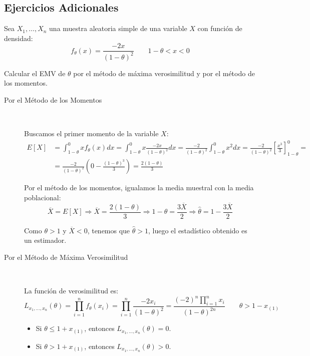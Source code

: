 \subsection*{Ejercicios Adicionales}
\begin{ejercicio}[Reto]
    Sea $X_1, \ldots, X_n$ una muestra aleatoria simple de una variable $X$ con función de densidad:
    \begin{equation*}
        f_\theta(x) = \dfrac{-2x}{(1-\theta)^2}\qquad 1-\theta < x < 0
    \end{equation*}

    Calcular el EMV de $\theta$ por el método de máxima verosimilitud y por el método de los momentos.
    \begin{description}
        \item[Por el Método de los Momentos]~
        
        Buscamos el primer momento de la variable $X$:
        \begin{align*}
            E[X] &= \int_{1-\theta}^{0} x f_\theta(x) dx = \int_{1-\theta}^{0} x \frac{-2x}{(1-\theta)^2} dx = \frac{-2}{(1-\theta)^2}\int_{1-\theta}^{0} x^2 dx = \frac{-2}{(1-\theta)^2}\left[\frac{x^3}{3}\right]_{1-\theta}^{0} =\\&= \frac{-2}{(1-\theta)^2}\left(0 - \frac{(1-\theta)^3}{3}\right) = \frac{2(1-\theta)}{3}
        \end{align*}

        Por el método de los momentos, igualamos la media muestral con la media poblacional:
        \begin{equation*}
            \overline{X} = E[X] \Longrightarrow \overline{X} = \frac{2(1-\theta)}{3} \Longrightarrow 1-\theta = \frac{3\overline{X}}{2} \Longrightarrow \widehat{\theta} = 1 - \frac{3\overline{X}}{2}
        \end{equation*}

        Como $\theta>1$ y $\overline{X}<0$, tenemos que $\widehat{\theta}>1$, luego el estadístico obtenido es un estimador.

        
        \item[Por el Método de Máxima Verosimilitud]~
        
        La función de verosimilitud es:
        \begin{equation*}
            L_{x_1,\ldots,x_n}(\theta) = \prod_{i=1}^{n} f_\theta(x_i) = \prod_{i=1}^{n} \frac{-2x_i}{(1-\theta)^2} = \frac{(-2)^n \prod_{i=1}^{n} x_i}{(1-\theta)^{2n}}\qquad \theta > 1 - x_{(1)}
        \end{equation*}
        \begin{itemize}
            \item Si $\theta \leq 1 + x_{(1)}$, entonces $L_{x_1,\ldots,x_n}(\theta) = 0$.
            \item Si $\theta > 1 + x_{(1)}$, entonces $L_{x_1,\ldots,x_n}(\theta) > 0$.
        \end{itemize}


\end{description}
\end{ejercicio}
